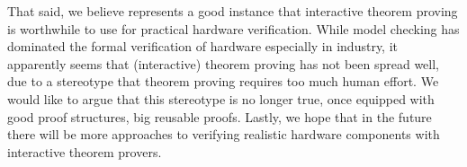 That said, we believe \hemiola{} represents a good instance that interactive theorem proving is worthwhile to use for practical hardware verification.
While model checking has dominated the formal verification of hardware especially in industry, it apparently seems that (interactive) theorem proving has not been spread well, due to a stereotype that theorem proving requires too much human effort.
We would like to argue that this stereotype is no longer true, once equipped with good proof structures, \eg{} big reusable proofs.
Lastly, we hope that in the future there will be more approaches to verifying realistic hardware components with interactive theorem provers.

